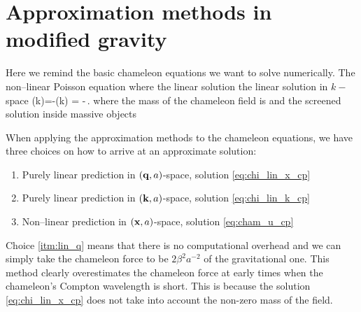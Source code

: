 \section{Approximation methods in modified gravity}
Here we remind the basic chameleon equations we want to solve numerically. The non--linear Poisson equation
where
the linear solution
the linear solution in $k-$space
\eq
{
\label{eq:chi_lin_k_cp}
	\hat{\chi}(k)=-\hat{\delta}(k) = -\,.
}
where the mass of the chameleon field is
and the screened solution inside massive objects

When applying the approximation methods to the chameleon equations, we have three choices on how to arrive at an approximate solution:
\begin{enumerate}
\item \label{itm:lin_q} Purely linear prediction in $(\mathbf q, a)$-space, solution \eqref{eq:chi_lin_x_cp}

\item \label{itm:lin_k} Purely linear prediction in $(\mathbf k, a)$-space, solution \eqref{eq:chi_lin_k_cp}

\item \label{itm:nl_x} Non--linear prediction in $(\mathbf x, a)$-space, solution \eqref{eq:cham_u_cp}
\end{enumerate}

Choice \ref{itm:lin_q} means that there is no computational overhead and we can simply take the chameleon force to be $2\beta^2a^{-2}$ of the gravitational one. This method clearly overestimates the chameleon force at early times when the chameleon's Compton wavelength is short. This is because the solution \eqref{eq:chi_lin_x_cp} does not take into account the non-zero mass of the field.

